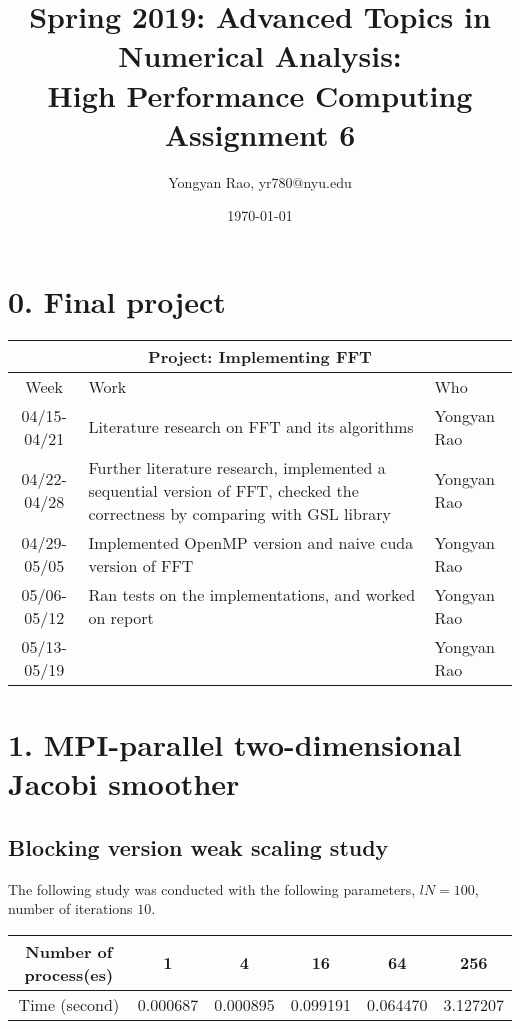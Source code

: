 \documentclass[amsmath,amssymb]{revtex4}
\begin{document}
\title{Spring 2019: Advanced Topics in Numerical Analysis:\\
High Performance Computing\\
Assignment 6}
\author{Yongyan Rao, yr780@nyu.edu}
\date{\today}
\maketitle


\section{\label{sec:sec0}0. Final project}
\begin{center}
  \begin{tabular}{|c|p{10cm}|p{3cm}|}
    \hline
    \multicolumn{3}{|c|}{\bf Project: Implementing FFT} \\
    \hline
    Week & Work & Who  \\ \hline \hline
    04/15-04/21 & Literature research on FFT and its algorithms & Yongyan Rao \\ \hline
    04/22-04/28 & Further literature research, implemented a sequential version of FFT, checked the correctness by comparing with GSL library & Yongyan Rao \\ \hline
    04/29-05/05 & Implemented OpenMP version and naive cuda version of FFT & Yongyan Rao\\ \hline
    05/06-05/12 & Ran tests on the implementations, and worked on report & Yongyan Rao \\ \hline
    05/13-05/19 &   & Yongyan Rao \\ \hline
  \end{tabular}
  \end{center}


\section{\label{sec:sec1}1. MPI-parallel two-dimensional Jacobi smoother}
\subsection{\label{sec:sec1.1}Blocking version weak scaling study}
The following study was conducted with the following parameters, $lN=100$, number of iterations $10$.
\begin{center}
  \begin{tabular}{c | c | c | c | c | c}
    \hline
Number of process(es) & 1  & 4 & 16 & 64 &256     \\ \hline
Time            (second)    & 0.000687 & 0.000895 & 0.099191 & 0.064470 & 3.127207 \\ \hline
  \end{tabular}
\end{center}
\end{document}
